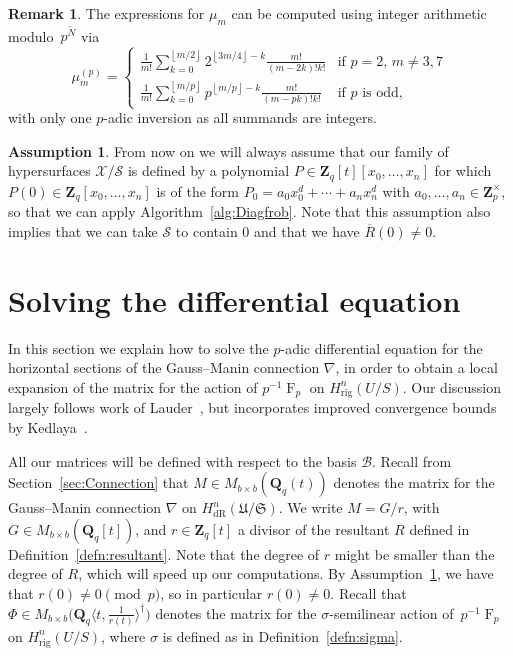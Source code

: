 \documentclass[a4paper,11pt]{article}
\numberwithin{equation}{section}
\providecommand{\floor}[1]{\left\lfloor#1\right\rfloor}   %
\newcommand{\ZZ}{\mathbf{Z}} %
\newcommand{\QQ}{\mathbf{Q}} %
\DeclareMathOperator{\Frob}{F}           %
\providecommand{\HdR}{H_{\text{dR}}}    %
\providecommand{\Hrig}{H_{\text{rig}}}  %
\providecommand{\cB}{\mathcal{B}} %
\theoremstyle{definition}
\newtheorem{rem}[thm]{Remark}
\newtheorem{assump}[thm]{Assumption}
\begin{document}
\begin{rem} \label{rem:mup}
The expressions for $\mu_m$ can be computed using integer arithmetic 
modulo~$p^{\tilde{N}}$ via 
\begin{equation*}
\mu_m^{(p)} = \begin{cases}
\frac{1}{m!} \sum_{k=0}^{\floor{m/2}} 2^{\floor{3m/4} - k} \frac{m!}{(m-2k)! k!}
    & \text{if $p = 2$, $m \neq 3, 7$} \\
\frac{1}{m!} \sum_{k=0}^{\floor{m/p}} p^{\floor{m/p} - k} \frac{m!}{(m-pk)! k!}
    & \text{if $p$ is odd},
\end{cases}
\end{equation*}
with only one $p$-adic inversion as all summands are integers. 
\end{rem}

\begin{assump} \label{assump:diag}
From now on we will always assume that our family of 
hypersurfaces $\mathcal{X}/\mathcal{S}$ is defined by a 
polynomial $P \in \ZZ_q[t][x_0,\ldots,x_n]$ for which 
$P(0) \in \ZZ_q[x_0,\ldots,x_n]$ is of the form 
$P_0=a_0 x_0^d + \dotsb + a_n x_n^d$ with $a_0,\dotsc,a_n \in \ZZ_p^{\times}$, 
so that we can apply Algorithm~\ref{alg:Diagfrob}. Note that this assumption 
also implies that we can take $\mathcal{S}$ to contain $0$ and that we have 
$\overline{R}(0) \neq 0$.
\end{assump}


\section{Solving the differential equation}
\label{sec:DifferentialSystem}

In this section we explain how to solve the $p$-adic differential 
equation for the horizontal sections of the Gauss--Manin 
connection $\nabla$, in order to obtain a local expansion of the 
matrix for the action of $p^{-1} \Frob_p$ on $\Hrig^{n}(U/S)$.  
Our discussion largely follows work of Lauder~\citep{Lauder2006}, 
but incorporates improved convergence bounds by Kedlaya~\citep{Kedlaya2010}.

All our matrices will be defined with respect to the basis $\cB$. Recall from 
Section~\ref{sec:Connection} that $M \in M_{b \times b}(\QQ_q(t))$ denotes 
the matrix for the Gauss--Manin connection $\nabla$ on 
$\HdR^n(\mathfrak{U}/\mathfrak{S})$. We write $M = G/r$, with 
$G \in M_{b \times b}(\QQ_q[t])$, and $r \in \ZZ_q[t]$ a divisor of the 
resultant $R$ defined in Definition~\ref{defn:resultant}. Note that the 
degree of $r$ might be smaller than the degree of $R$, which will speed up 
our computations. By Assumption~\ref{assump:diag}, we have that 
$r(0) \neq 0 \pmod{p}$, so in particular $r(0) \neq 0$. Recall that 
$\Phi \in M_{b \times b} \bigl(\QQ_q \langle t,\frac{1}{r(t)} \rangle^{\dag} \bigr)$ 
denotes the matrix for the $\sigma$-semilinear action of~$p^{-1} \Frob_p$ 
on $\Hrig^{n}(U/S)$, where $\sigma$ is defined as 
in Definition~\ref{defn:sigma}. 
\end{document}
